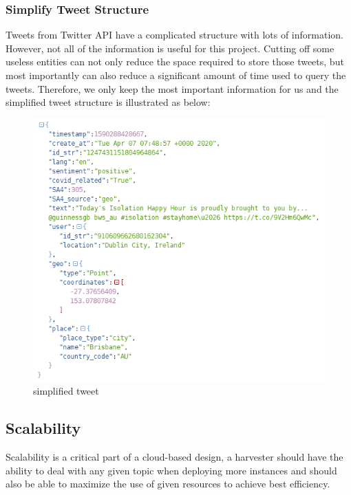 \subsubsection{Simplify Tweet Structure}
Tweets from Twitter API have a complicated structure with lots of information. However, not all of the information is useful for this project. Cutting off some useless entities can not only reduce the space required to store those tweets, but most importantly can also reduce a significant amount of time used to query the tweets. Therefore, we only keep the most important information for us and the simplified tweet structure is illustrated as below:

\begin{figure}[H]
\centering
\includegraphics[scale=0.7]{city_analytics/report/images/simplifiedtweet.png}
\caption{simplified tweet}
\label{fig:simplified tweet}
\end{figure}


\subsection{Scalability}

Scalability is a critical part of a cloud-based design, a harvester should have the ability to deal with any given topic when deploying more instances and should also be able to maximize the use of given resources to achieve best efficiency.

